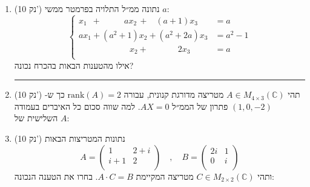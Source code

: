 \documentclass[12pt, a4paper]{article}
\newcommand{\cc}{\mathbb{C}}
\newcommand{\rr}{\mathbb{R}}
\newcommand{\points}[1]{(#1 נק') }
\begin{document}
\begin{enumerate}
\noindent\rule{\textwidth-30pt}{0.4pt}


\item\points{10}
נתונה ממ״ל התלויה בפרמטר ממשי
$a$:
$$\begin{cases}
x_1\,\,\,+\quad \quad\,\,\, \, ax_2\,+\,\,\,\,\,(a+1)x_3&=a\\
ax_1+(a^2+1)x_2+(a^2+2a)x_3&=a^2-1\\
\quad\quad \quad\quad\quad\quad x_2+\quad\quad\quad\,\, \,2x_3&=a\\
\end{cases}$$
אילו מהטענות הבאות בהכרח נכונה?
\begin{enumerate}
\end{enumerate}

\noindent\rule{\textwidth-30pt}{0.4pt}



\item\points{10}
תהי
$A\in M_{4\times 3}(\cc)$
מטריצה מדורגת קנונית, עבורה
$\mathrm{rank}(A)=2$
כך ש-
$(1,0,-2)$
פתרון של הממ״ל
$AX=0$.
למה שווה סכום כל האיברים בעמודה השלישית של
$A$:
\begin{enumerate}
\end{enumerate}

\newpage





\item\points{10}
נתונות המטריצות הבאות
$$A=\begin{pmatrix}
1&2+i\\i+1&2\\
\end{pmatrix}\quad,\quad
B=\begin{pmatrix}
2i&1\\0&i\\
\end{pmatrix}$$
ותהי
$C\in M_{2\times 2}(\cc)$
מטריצה  המקיימת
$A\cdot C=B$.
בחרו את הטענה הנכונה:
\begin{enumerate}
\end{enumerate}


\end{enumerate}
\end{document}
